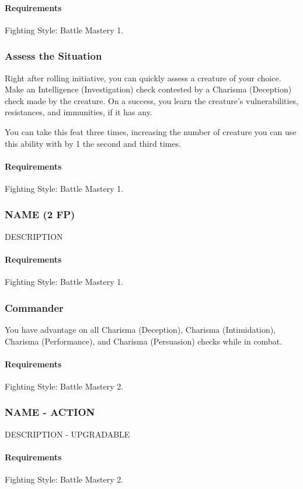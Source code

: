     \paragraph{Requirements} Fighting Style: Battle Mastery 1.
\subsubsection{Assess the Situation} \label{feat::assessthesituation}
    Right after rolling initiative, you can quickly assess a creature of your choice.
    Make an Intelligence (Investigation) check contested by a Charisma (Deception) check made by the creature.
    On a success, you learn the creature's vulnerabilities, resistances, and immunities, if it has any.

    You can take this feat three times, increasing the number of creature you can use this ability with by 1 the second and third times.
    \paragraph{Requirements} Fighting Style: Battle Mastery 1.
\subsubsection{NAME (2 FP)} \label{feat::name}
    DESCRIPTION
    \paragraph{Requirements} Fighting Style: Battle Mastery 1.
\subsubsection{Commander} \label{feat::commander}
    You have advantage on all Charisma (Deception), Charisma (Intimidation), Charisma (Performance), and Charisma (Persuasion) checks while in combat.
    \paragraph{Requirements} Fighting Style: Battle Mastery 2.
\subsubsection{NAME - ACTION} \label{feat::name}
    DESCRIPTION - UPGRADABLE
    \paragraph{Requirements} Fighting Style: Battle Mastery 2.
